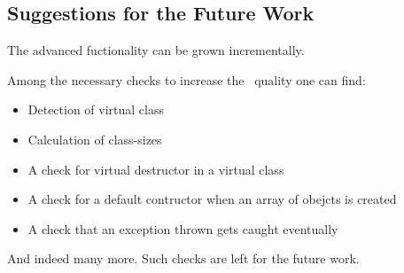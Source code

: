 \subsection{Suggestions for the Future Work}

The advanced  fuctionality can be grown incrementally. 

Among the necessary checks to increase the \pcpp\ quality one can find:
\begin{itemize}
 \item Detection of virtual class
 \item Calculation of class-sizes
 \item A check for virtual destructor in a virtual class
 \item A check for a default contructor when an array of obejcts is created
 \item A check that an exception thrown gets caught eventually
\end{itemize}

And indeed many more. Such checks are left for the future work.


